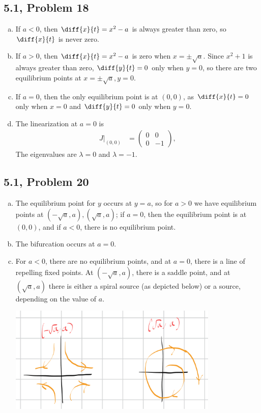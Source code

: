 \documentclass[10pt]{mypackage}
\begin{document}
\subsection{5.1, Problem 18}%
\begin{enumerate}[(a)]
  \item If $a < 0$, then $\diff{x}{t} = x^2 - a$ is always greater than zero, so $\diff{x}{t}$ is never zero.
  \item If $ a > 0 $, then $\diff{x}{t} = x^2 - a$ is zero when $x = \pm \sqrt{a}$. Since $x^2 + 1$ is always greater than zero, $\diff{y}{t} = 0$ only when $y = 0$, so there are two equilibrium points at $x = \pm \sqrt{a},y=0$.
  \item If $ a = 0 $, then the only equilibrium point is at $\left(0,0\right)$, as $\diff{x}{t} = 0$ only when $x = 0$ and $\diff{y}{t} = 0$ only when $y = 0$.
  \item The linearization at $ a = 0 $ is
    \begin{align*}
      J|_{(0,0)} &= \begin{pmatrix}0 & 0 \\ 0 & -1\end{pmatrix},
    \end{align*}
    The eigenvalues are $\lambda = 0$ and $\lambda = -1$.
\end{enumerate}
\subsection{5.1, Problem 20}%
\begin{enumerate}[(a)]
  \item The equilibrium point for $y$ occurs at $y = a$, so for $a > 0$ we have equilibrium points at $\left(-\sqrt{a},a\right), \left(\sqrt{a},a\right)$; if $a = 0$, then the equilibrium point is at $\left(0,0\right)$, and if $a < 0$, there is no equilibrium point.
  \item The bifurcation occurs at $a = 0$.
  \item For $a < 0$, there are no equilibrium points, and at $a = 0$, there is a line of repelling fixed points. At $\left(-\sqrt{a},a\right)$, there is a saddle point, and at $\left(\sqrt{a},a\right)$ there is either a spiral source (as depicted below) or a source, depending on the value of $a$.
    \begin{center}
      \includegraphics[width=10cm]{images/5_1_20c.png}
    \end{center}
\end{enumerate}
\end{document}
